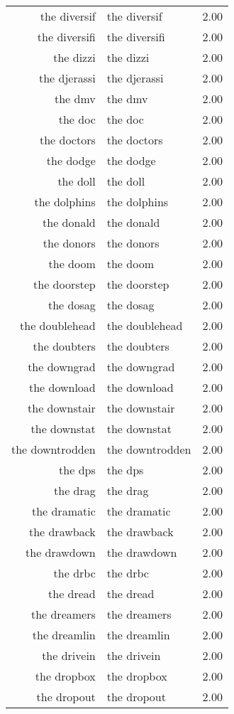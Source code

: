 \begin{table}[ht]
\begin{tabular}{rlr}
  the diversif & the diversif & 2.00 \\ 
  the diversifi & the diversifi & 2.00 \\ 
  the dizzi & the dizzi & 2.00 \\ 
  the djerassi & the djerassi & 2.00 \\ 
  the dmv & the dmv & 2.00 \\ 
  the doc & the doc & 2.00 \\ 
  the doctors & the doctors & 2.00 \\ 
  the dodge & the dodge & 2.00 \\ 
  the doll & the doll & 2.00 \\ 
  the dolphins & the dolphins & 2.00 \\ 
  the donald & the donald & 2.00 \\ 
  the donors & the donors & 2.00 \\ 
  the doom & the doom & 2.00 \\ 
  the doorstep & the doorstep & 2.00 \\ 
  the dosag & the dosag & 2.00 \\ 
  the doublehead & the doublehead & 2.00 \\ 
  the doubters & the doubters & 2.00 \\ 
  the downgrad & the downgrad & 2.00 \\ 
  the download & the download & 2.00 \\ 
  the downstair & the downstair & 2.00 \\ 
  the downstat & the downstat & 2.00 \\ 
  the downtrodden & the downtrodden & 2.00 \\ 
  the dps & the dps & 2.00 \\ 
  the drag & the drag & 2.00 \\ 
  the dramatic & the dramatic & 2.00 \\ 
  the drawback & the drawback & 2.00 \\ 
  the drawdown & the drawdown & 2.00 \\ 
  the drbc & the drbc & 2.00 \\ 
  the dread & the dread & 2.00 \\ 
  the dreamers & the dreamers & 2.00 \\ 
  the dreamlin & the dreamlin & 2.00 \\ 
  the drivein & the drivein & 2.00 \\ 
  the dropbox & the dropbox & 2.00 \\ 
  the dropout & the dropout & 2.00 \\ 

\end{tabular}
\end{table}
